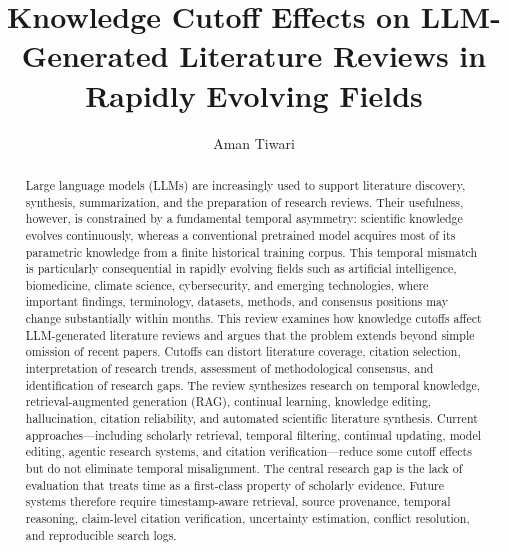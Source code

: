 \documentclass[manuscript,screen]{acmart}
\title{Knowledge Cutoff Effects on LLM-Generated Literature Reviews in Rapidly Evolving Fields}
\author{Aman Tiwari}
\affiliation{%
  \institution{Indian Institute of Information Technology}
  \country{Prayagraj}
  \country{India}}
\begin{document}
\begin{abstract}
Large language models (LLMs) are increasingly used to support literature discovery, synthesis,
summarization, and the preparation of research reviews. Their usefulness, however, is constrained by a
fundamental temporal asymmetry: scientific knowledge evolves continuously, whereas a conventional
pretrained model acquires most of its parametric knowledge from a finite historical training corpus. This
temporal mismatch is particularly consequential in rapidly evolving fields such as artificial intelligence,
biomedicine, climate science, cybersecurity, and emerging technologies, where important findings,
terminology, datasets, methods, and consensus positions may change substantially within months. This
review examines how knowledge cutoffs affect LLM-generated literature reviews and argues that the problem
extends beyond simple omission of recent papers. Cutoffs can distort literature coverage, citation selection,
interpretation of research trends, assessment of methodological consensus, and identification of research
gaps. The review synthesizes research on temporal knowledge, retrieval-augmented generation (RAG),
continual learning, knowledge editing, hallucination, citation reliability, and automated scientific literature
synthesis. Current approaches—including scholarly retrieval, temporal filtering, continual updating, model
editing, agentic research systems, and citation verification—reduce some cutoff effects but do not eliminate
temporal misalignment. The central research gap is the lack of evaluation that treats time as a first-class
property of scholarly evidence. Future systems therefore require timestamp-aware retrieval, source
provenance, temporal reasoning, claim-level citation verification, uncertainty estimation, conflict resolution,
and reproducible search logs.
\end{abstract}


\maketitle
\end{document}
